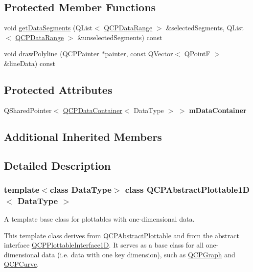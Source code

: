\subsection*{Protected Member Functions}
\begin{DoxyCompactItemize}
\item 
void \mbox{\hyperlink{class_q_c_p_abstract_plottable1_d_ae890e62ce403c54f575c73b9529f1af8}{get\+Data\+Segments}} (Q\+List$<$ \mbox{\hyperlink{class_q_c_p_data_range}{Q\+C\+P\+Data\+Range}} $>$ \&selected\+Segments, Q\+List$<$ \mbox{\hyperlink{class_q_c_p_data_range}{Q\+C\+P\+Data\+Range}} $>$ \&unselected\+Segments) const
\item 
void \mbox{\hyperlink{class_q_c_p_abstract_plottable1_d_a7adc6c3cccebb5341f11e0c2b7d54206}{draw\+Polyline}} (\mbox{\hyperlink{class_q_c_p_painter}{Q\+C\+P\+Painter}} $\ast$painter, const Q\+Vector$<$ Q\+PointF $>$ \&line\+Data) const
\end{DoxyCompactItemize}
\subsection*{Protected Attributes}
\begin{DoxyCompactItemize}
\item 
\mbox{\label{class_q_c_p_abstract_plottable1_d_ac139cf70590707a1fb40eabe97fac246}} 
Q\+Shared\+Pointer$<$ \mbox{\hyperlink{class_q_c_p_data_container}{Q\+C\+P\+Data\+Container}}$<$ Data\+Type $>$ $>$ {\bfseries m\+Data\+Container}
\end{DoxyCompactItemize}
\subsection*{Additional Inherited Members}


\subsection{Detailed Description}
\subsubsection*{template$<$class Data\+Type$>$\newline
class Q\+C\+P\+Abstract\+Plottable1\+D$<$ Data\+Type $>$}

A template base class for plottables with one-\/dimensional data. 

This template class derives from \mbox{\hyperlink{class_q_c_p_abstract_plottable}{Q\+C\+P\+Abstract\+Plottable}} and from the abstract interface \mbox{\hyperlink{class_q_c_p_plottable_interface1_d}{Q\+C\+P\+Plottable\+Interface1D}}. It serves as a base class for all one-\/dimensional data (i.\+e. data with one key dimension), such as \mbox{\hyperlink{class_q_c_p_graph}{Q\+C\+P\+Graph}} and \mbox{\hyperlink{class_q_c_p_curve}{Q\+C\+P\+Curve}}.

